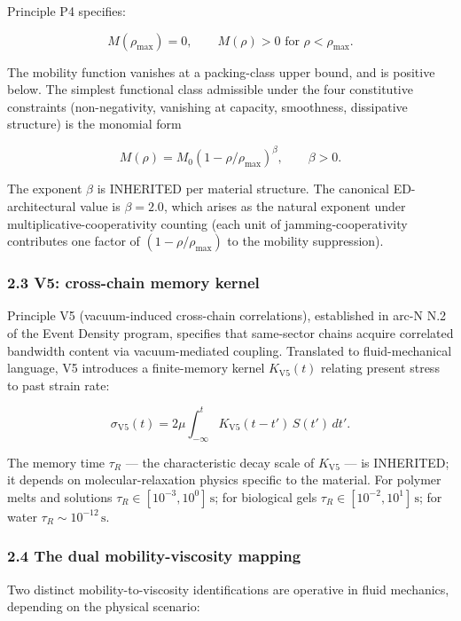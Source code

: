 \documentclass[
  11pt,a4paper]{article}
\begin{document}
Principle P4 specifies:

\[M(\rho_\mathrm{max}) = 0, \qquad M(\rho) > 0 \text{ for } \rho < \rho_\mathrm{max}.\]

The mobility function vanishes at a packing-class upper bound, and is
positive below. The simplest functional class admissible under the four
constitutive constraints (non-negativity, vanishing at capacity,
smoothness, dissipative structure) is the monomial form

\[M(\rho) = M_0 (1 - \rho/\rho_\mathrm{max})^\beta, \qquad \beta > 0.\]

The exponent \(\beta\) is INHERITED per material structure. The
canonical ED-architectural value is \(\beta = 2.0\), which arises as the
natural exponent under multiplicative-cooperativity counting (each unit
of jamming-cooperativity contributes one factor of
\((1 - \rho/\rho_\mathrm{max})\) to the mobility suppression).

\subsubsection{2.3 V5: cross-chain memory
kernel}\label{v5-cross-chain-memory-kernel}

Principle V5 (vacuum-induced cross-chain correlations), established in
arc-N N.2 of the Event Density program, specifies that same-sector
chains acquire correlated bandwidth content via vacuum-mediated
coupling. Translated to fluid-mechanical language, V5 introduces a
finite-memory kernel \(K_\mathrm{V5}(t)\) relating present stress to
past strain rate:

\[\sigma_\mathrm{V5}(t) = 2\mu \int_{-\infty}^t K_\mathrm{V5}(t - t') \, S(t') \, dt'.\]

The memory time \(\tau_R\) --- the characteristic decay scale of
\(K_\mathrm{V5}\) --- is INHERITED; it depends on molecular-relaxation
physics specific to the material. For polymer melts and solutions
\(\tau_R \in [10^{-3}, 10^0]\,\mathrm{s}\); for biological gels
\(\tau_R \in [10^{-2}, 10^1]\,\mathrm{s}\); for water
\(\tau_R \sim 10^{-12}\,\mathrm{s}\).

\subsubsection{2.4 The dual mobility-viscosity
mapping}\label{the-dual-mobility-viscosity-mapping}

Two distinct mobility-to-viscosity identifications are operative in
fluid mechanics, depending on the physical scenario:
\end{document}
